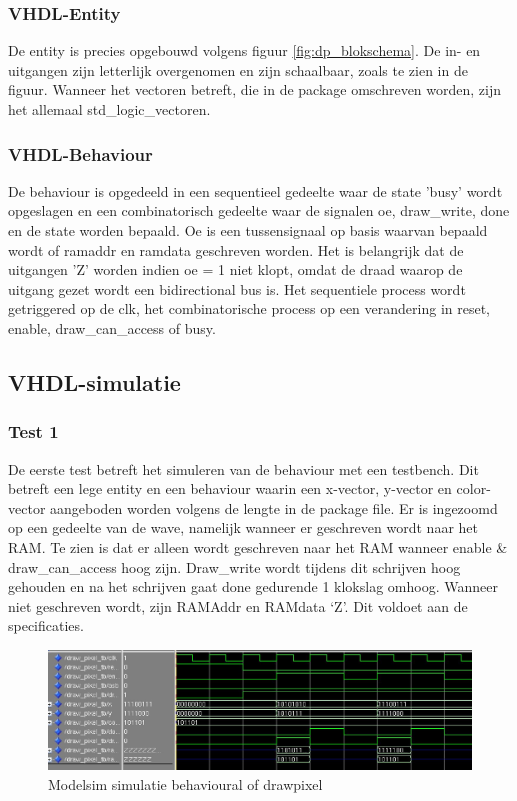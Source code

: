 \documentclass{scrartcl} %
\begin{document}
\subsubsection{VHDL-Entity}
De entity is precies opgebouwd volgens  figuur  \ref{fig:dp_blokschema}. De in- en uitgangen zijn letterlijk overgenomen en zijn schaalbaar, zoals te zien in de figuur. Wanneer het vectoren betreft, die in de package omschreven worden, zijn het allemaal std\_logic\_vectoren. 

\subsubsection{VHDL-Behaviour}
De behaviour is opgedeeld in een sequentieel gedeelte waar de state 'busy' wordt opgeslagen en een combinatorisch gedeelte waar de signalen oe, draw\_write, done en de state worden bepaald. Oe is een tussensignaal op basis waarvan bepaald wordt of ramaddr en ramdata geschreven worden. Het is belangrijk dat de uitgangen 'Z' worden indien oe = 1 niet klopt, omdat de draad waarop de uitgang gezet wordt een bidirectional bus is. Het sequentiele process wordt getriggered op de clk, het combinatorische process op een verandering in reset, enable, draw\_can\_access of busy. 

\subsection{VHDL-simulatie}
\subsubsection{Test 1}
De eerste test betreft het simuleren van de behaviour met een testbench. Dit betreft een lege entity en een behaviour waarin een x-vector, y-vector en color-vector aangeboden worden volgens de lengte in de package file.  Er is ingezoomd op een gedeelte van de wave, namelijk wanneer er geschreven wordt naar het RAM. Te zien is dat er alleen wordt geschreven naar het RAM wanneer enable \& draw\_can\_access hoog zijn.  Draw\_write wordt tijdens dit schrijven hoog gehouden en na het schrijven gaat done gedurende 1 klokslag omhoog. Wanneer niet geschreven wordt,  zijn RAMAddr en RAMdata `Z'. Dit voldoet aan de specificaties. 

\begin{figure} [h!]
\centering
\includegraphics [width = \textwidth] {resource/dp_new_wave-rc.jpg}
\caption{Modelsim simulatie behavioural of drawpixel}
\label{fig:dp_sim}
\end{figure}
\end{document}
